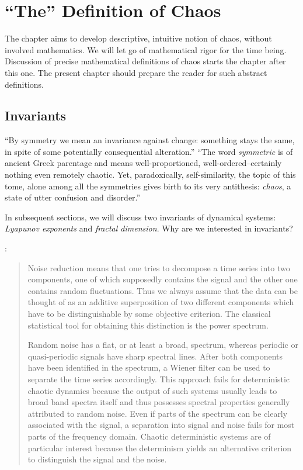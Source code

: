 \documentclass[11pt]{book}
\begin{document}
\chapter{``The'' Definition of Chaos}
The chapter aims to develop descriptive, intuitive notion of chaos, without involved mathematics.
We will let go of mathematical rigor for the time being.
Discussion of precise mathematical definitions of chaos starts the chapter after this one.
The present chapter should prepare the reader for such abstract definitions.

\section{Invariants}
``By symmetry we mean an invariance against change: something stays the same, in spite of some potentially consequential alteration.''
%
``The word \textit{symmetric} is of ancient Greek parentage and means well-proportioned, well-ordered--certainly nothing even remotely chaotic.
Yet, paradoxically, self-similarity, the topic of this tome, alone among all the symmetries gives birth to its very antithesis: \textit{chaos}, a state of utter confusion and disorder.''
\cite[p.xiii-xv]{schroeder}

In subsequent sections, we will discuss two invariants of dynamical systems: \textit{Lyapunov exponents} and \textit{fractal dimension}.
Why are we interested in invariants?

\citet[p.51]{kantz-schreiber}:
\begin{quotation}
Noise reduction means that one tries to decompose a time series into two components, one of which supposedly contains the signal and the other one contains random fluctuations.
Thus we always assume that the data can be thought of as an additive superposition of two different components which have to be distinguishable by some objective criterion.
The classical statistical tool for obtaining this distinction is the power spectrum.

Random noise has a flat, or at least a broad, spectrum, whereas periodic or quasi-periodic signals have sharp spectral lines.
After both components have been identified in the spectrum, a Wiener filter can be used to separate the time series accordingly.
This approach fails for deterministic chaotic dynamics because the output of such systems usually leads to broad band spectra itself and thus possesses spectral properties generally attributed to random noise.
Even if parts of the spectrum can be clearly associated with the signal, a separation into signal and noise fails for most parts of the frequency domain. Chaotic deterministic systems are of particular interest because the determinism yields an alternative criterion to distinguish the signal and the noise. 
\end{quotation}
\end{document}

